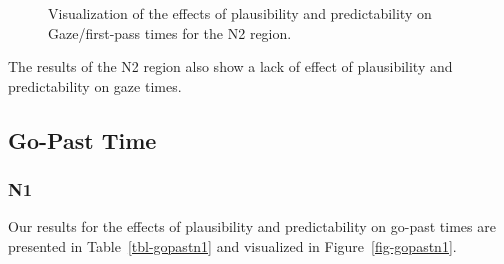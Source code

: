 \documentclass[
  letterpaper,
  DIV=11,
  numbers=noendperiod,
  nottoc]{scrreprt}
\begin{document}
\begin{figure}[htbp]


\caption{\label{fig-gazen2}Visualization of the effects of plausibility
and predictability on Gaze/first-pass times for the N2 region.}

\end{figure}%

The results of the N2 region also show a lack of effect of plausibility
and predictability on gaze times.

\subsection{Go-Past Time}\label{go-past-time}

\subsubsection{N1}\label{n1-2}

Our results for the effects of plausibility and predictability on
go-past times are presented in Table~\ref{tbl-gopastn1} and visualized
in Figure~\ref{fig-gopastn1}.
\end{document}
